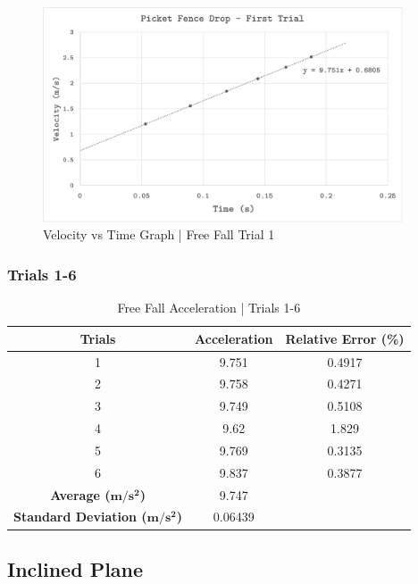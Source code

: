 \begin{figure}
	\begin{center}
		\includegraphics[width=0.95\textwidth]{picket1.png}
	\end{center}
	\caption{Velocity vs Time Graph | Free Fall Trial 1}
	\label{fig: picketg1}
\end{figure} 


\subsubsection{Trials 1-6}

\begin{table}[H]
\centering
\begin{tabular}{@{}ccc@{}}
\toprule
\textbf{Trials} & \textbf{Acceleration} & \textbf{Relative Error (\%)} \\ \midrule
1 & 9.751 & 0.4917 \\
2 & 9.758 & 0.4271 \\
3 & 9.749 & 0.5108 \\
4 & 9.62 & 1.829 \\
5 & 9.769 & 0.3135 \\
6 & 9.837 & 0.3877 \\ \midrule
\textbf{Average ($\boldsymbol{m/s^2}$)} & 9.747 &  \\
\textbf{Standard Deviation ($\boldsymbol{m/s^2}$)} & 0.06439 &  \\ \bottomrule
\end{tabular}
\caption{Free Fall Acceleration | Trials 1-6}
\label{tab:ff-ta}
\end{table}

\subsection{Inclined Plane}

